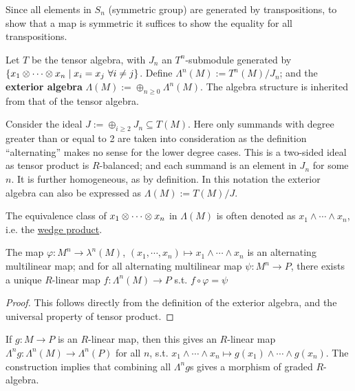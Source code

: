 \begin{remark}
    Since all elements in $S_n$ (symmetric group) are generated by transpositions, to show that a map is symmetric it suffices to show the equality for all transpositions.
\end{remark}

\begin{definition}
    Let $T$ be the tensor algebra, with $J_n$ an $T^n$-submodule generated by $\{x_1 \otimes \cdots \otimes x_n \mid x_i = x_j\ \forall i \neq j\}$. Define $\Lambda^n(M) := T^n(M) / J_n$; and the \textbf{exterior algebra} $\Lambda(M) := \oplus_{n \geq 0} \Lambda^n(M)$. The algebra structure is inherited from that of the tensor algebra. 
\end{definition}

\begin{remark}
    Consider the ideal $J := \oplus_{i \geq 2} J_n \subseteq T(M)$. Here only summands with degree greater than or equal to 2 are taken into consideration as the definition ``alternating'' makes no sense for the lower degree cases. This is a two-sided ideal as tensor product is $R$-balanced; and each summand is an element in $J_n$ for some $n$. It is further homogeneous, as by definition. In this notation the exterior algebra can also be expressed as $\Lambda(M) := T(M)/J$.
\end{remark}

\begin{remark}
    The equivalence class of $x_1 \otimes \cdots \otimes x_n$ in $\Lambda(M)$ is often denoted as $x_1 \wedge \cdots \wedge x_n$, i.e. the \underline{wedge product}.
\end{remark}

\begin{proposition}
    The map $\varphi: M^n \to \lambda^n(M)$, $(x_1, \cdots, x_n) \mapsto x_1 \wedge \cdots \wedge x_n$ is an alternating multilinear map; and for all alternating multilinear map $\psi: M^n \to P$, there exists a unique $R$-linear map $f: \Lambda^n(M) \to P$ s.t. $f \circ \varphi = \psi$
\end{proposition}

\begin{proof}
    This follows directly from the definition of the exterior algebra, and the universal property of tensor product.
\end{proof}

\begin{example}
    If $g: M \to P$ is an $R$-linear map, then this gives an $R$-linear map $\Lambda^n g: \Lambda^n(M) \to \Lambda^n(P)$ for all $n$, s.t. $x_1 \wedge \cdots \wedge x_n \mapsto g(x_1) \wedge \cdots \wedge g(x_n)$. The construction implies that combining all $\Lambda^n g$s gives a morphism of graded $R$-algebra. 
\end{example}

